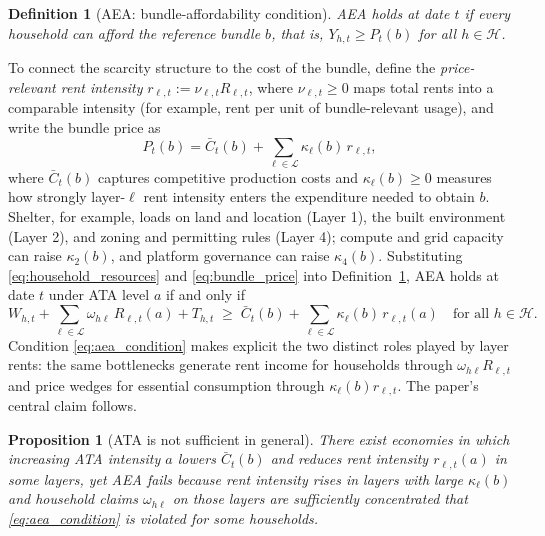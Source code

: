 \documentclass[11pt]{article}
\newtheorem{proposition}{Proposition}
\newtheorem{definition}{Definition}
\begin{document}
\begin{definition}[AEA: bundle-affordability condition]
\label{def:aea_formal}
AEA holds at date \(t\) if every household can afford the reference bundle \(b\), that is, \(Y_{h,t}\ge P_t(b)\) for all \(h\in\mathcal{H}\).
\end{definition}

To connect the scarcity structure to the cost of the bundle, define the \emph{price-relevant rent intensity} \(r_{\ell,t}:=\nu_{\ell,t}R_{\ell,t}\), where \(\nu_{\ell,t}\ge 0\) maps total rents into a comparable intensity (for example, rent per unit of bundle-relevant usage), and write the bundle price as
\begin{equation}
P_t(b)=\bar{C}_t(b)+\sum_{\ell\in\mathcal{L}} \kappa_\ell(b)\,r_{\ell,t},
\label{eq:bundle_price}
\end{equation}
where \(\bar{C}_t(b)\) captures competitive production costs and \(\kappa_\ell(b)\ge 0\) measures how strongly layer-\(\ell\) rent intensity enters the expenditure needed to obtain \(b\). Shelter, for example, loads on land and location (Layer 1), the built environment (Layer 2), and zoning and permitting rules (Layer 4); compute and grid capacity can raise \(\kappa_2(b)\), and platform governance can raise \(\kappa_4(b)\). Substituting \eqref{eq:household_resources} and \eqref{eq:bundle_price} into Definition~\ref{def:aea_formal}, AEA holds at date \(t\) under ATA level \(a\) if and only if
\begin{equation}
W_{h,t}+\sum_{\ell\in\mathcal{L}} \omega_{h\ell}\,R_{\ell,t}(a)+T_{h,t}
\;\ge\;
\bar{C}_t(b)+\sum_{\ell\in\mathcal{L}} \kappa_\ell(b)\,r_{\ell,t}(a)
\quad \text{for all } h\in\mathcal{H}.
\label{eq:aea_condition}
\end{equation}
Condition \eqref{eq:aea_condition} makes explicit the two distinct roles played by layer rents: the same bottlenecks generate rent income for households through \(\omega_{h\ell}R_{\ell,t}\) and price wedges for essential consumption through \(\kappa_\ell(b)r_{\ell,t}\). The paper's central claim follows.

\begin{proposition}[ATA is not sufficient in general]
\label{prop:not_sufficient}
There exist economies in which increasing ATA intensity \(a\) lowers \(\bar{C}_t(b)\) and reduces rent intensity \(r_{\ell,t}(a)\) in some layers, yet AEA fails because rent intensity rises in layers with large \(\kappa_\ell(b)\) and household claims \(\omega_{h\ell}\) on those layers are sufficiently concentrated that \eqref{eq:aea_condition} is violated for some households.
\end{proposition}
\end{document}

